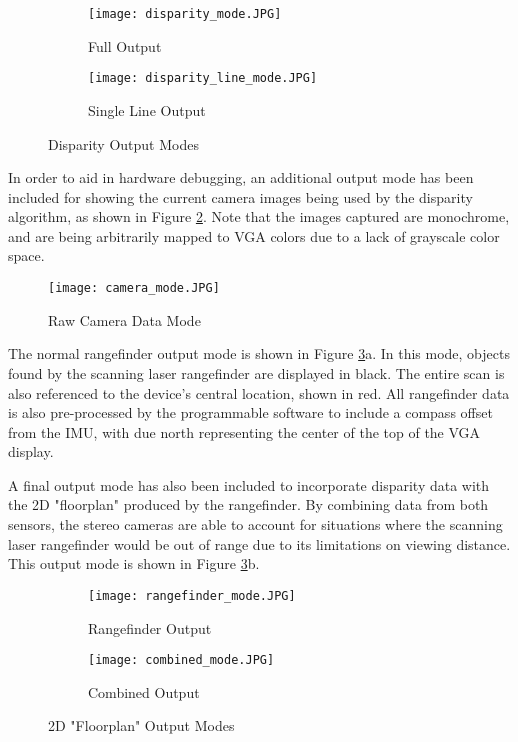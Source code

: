 \begin{figure}[H] 
         \begin{subfigure}[h]{0.5\textwidth}
              \centerline{\texttt{[image: disparity\_mode.JPG]}}
             \caption{Full Output}
         \end{subfigure}
         \begin{subfigure}[h]{0.5\textwidth}
             \centerline{\texttt{[image: disparity\_line\_mode.JPG]}}
             \caption{Single Line Output}
         \end{subfigure}
\caption{Disparity Output Modes}
\label{disparityOutputs}
\end{figure}
\par
In order to aid in hardware debugging, an additional output mode has been included for showing the current camera images being used by the disparity algorithm, as shown in Figure \ref{camOutMode}. Note that the images captured are monochrome, and are being arbitrarily mapped to VGA colors due to a lack of grayscale color space.
\par
\begin{figure}[H]  
 	\centerline{
	\texttt{[image: camera\_mode.JPG]}
	}
	\caption{Raw Camera Data Mode}
	\label{camOutMode}
\end{figure} 
\par
The normal rangefinder output mode is shown in Figure \ref{rangeOutputs}a. In this mode, objects found by the scanning laser rangefinder are displayed in black. The entire scan is also referenced to the device's central location, shown in red. All rangefinder data is also pre-processed by the programmable software to include a compass offset from the IMU, with due north representing the center of the top of the VGA display.
\par 
A final output mode has also been included to incorporate disparity data with the 2D "floorplan" produced by the rangefinder. By combining data from both sensors, the stereo cameras are able to account for situations where the scanning laser rangefinder would be out of range due to its limitations on viewing distance. This output mode is shown in Figure \ref{rangeOutputs}b.

\begin{figure}[H] 
         \begin{subfigure}[h]{0.5\textwidth}
              \centerline{\texttt{[image: rangefinder\_mode.JPG]}}
             \caption{Rangefinder Output}
         \end{subfigure}
         \begin{subfigure}[h]{0.5\textwidth}
             \centerline{\texttt{[image: combined\_mode.JPG]}}
             \caption{Combined Output}
         \end{subfigure}
\caption{2D "Floorplan" Output Modes}
\label{rangeOutputs}
\end{figure}
